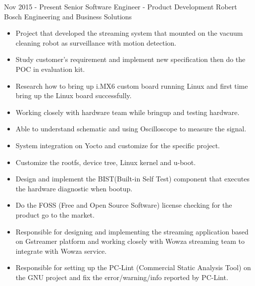 \documentclass[letterpaper]{twentysecondcv} %
\begin{document}
\begin{twenty} %
	\twentyitem
		{Nov 2015 -}
		{Present}
		{Senior Software Engineer - Product Development}
	    {Robert Bosch Engineering and Business Solutions}
	    {}
	    {\begin{itemize}
	    \item Project that developed the streaming system that mounted on the vacuum cleaning robot as
	    surveillance with motion detection.
	    \item Study customer’s requirement and implement new specification then do the POC in evaluation kit.
	    \item Research how to bring up i.MX6 custom board running Linux and first time bring up the
	    Linux board successfully.
	    \item Working closely with hardware team while bringup and testing hardware.
	    \item Able to understand schematic and using Oscilloscope to measure the signal.
	    \item System integration on Yocto and customize for the specific project.
	    \item Customize the rootfs, device tree, Linux kernel and u-boot.
	    \item Design and implement the BIST(Built-in Self Test) component that executes the hardware
	    diagnostic when bootup.
	    \item Do the FOSS (Free and Open Source Software) license checking for the product go to the
	    market.
	    \item Responsible for designing and implementing the streaming application based on Gstreamer
	    platform and working closely with Wowza streaming team to integrate with Wowza service.
	    \item Responsible for setting up the PC-Lint (Commercial Static Analysis Tool) on the GNU project and fix the error/warning/info reported by PC-Lint.
	    \end{itemize}}
    \\
    

\end{twenty}
\end{document}
